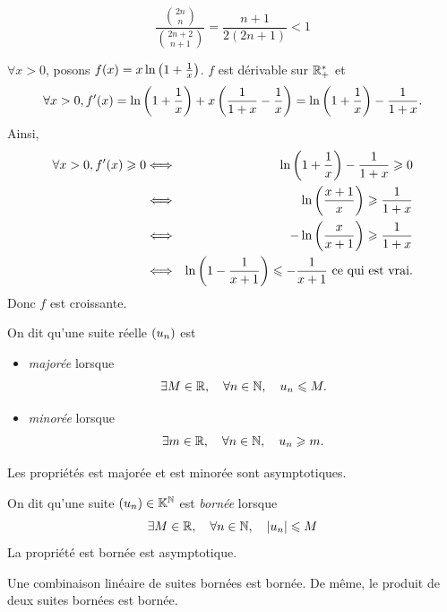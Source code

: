 \documentclass{magnolia}
\begin{document}
\begin{sol}
\[\frac{\binom{2n}{n}}{\binom{2n+2}{n+1}}=\frac{n+1}{2(2n+1)}<1\]

$\forall x>0$, posons $f(x)=x\ln\left(1+\frac{1}{x}\right)$.
$f$ est dérivable sur $\mathbb{R}_+^*$ et 
\[\forall x>0, f'(x)=\ln\left(1+\frac{1}{x}\right)+x\left(\frac{1}{1+x}-\frac{1}{x}\right)=\ln\left(1+\frac{1}{x}\right)-\frac{1}{1+x}.\]
Ainsi,
\begin{eqnarray*}
\forall x>0, f'(x)\geqslant0 &\Longleftrightarrow & \ln\left(1+\frac{1}{x}\right)-\frac{1}{1+x}\geqslant 0\\
&\Longleftrightarrow & \ln\left(\frac{x+1}{x}\right)\geqslant\frac{1}{1+x}\\
&\Longleftrightarrow & -\ln\left(\frac{x}{x+1}\right)\geqslant\frac{1}{1+x}\\
&\Longleftrightarrow & \ln\left(1-\frac{1}{x+1}\right)\leqslant-\frac{1}{x+1} \text{ ce qui est vrai.}
\end{eqnarray*}
Donc $f$ est croissante.
\end{sol}



\begin{definition}[utile=-3]
On dit qu'une suite réelle $\left(u_n\right)$ est
\begin{itemize}
\item \emph{majorée} lorsque
  \[\exists M\in\mathbb{R} ,\quad \forall n\in\mathbb{N} ,\quad u_n \leqslant M.\]
\item \emph{minorée} lorsque
  \[\exists m\in\mathbb{R} ,\quad \forall n\in\mathbb{N} ,\quad u_n \geqslant m.\]
\end{itemize}
Les propriétés \og est majorée \fg et \og est minorée \fg sont asymptotiques.
\end{definition}

\begin{definition}[utile=-3]
On dit qu'une suite $\left(u_n\right)\in\mathbb{K}^{\mathbb{N}}$ est \emph{bornée} lorsque
\[\exists M\in\mathbb{R} ,\quad \forall n\in\mathbb{N} ,\quad \left|u_n\right| \leqslant M\]
La propriété \og est bornée \fg est asymptotique.
\end{definition}

\begin{remarqueUnique}
\remarque Une combinaison linéaire de suites bornées est bornée. De même, le
  produit de deux suites bornées est bornée.
\end{remarqueUnique}
\end{document}
